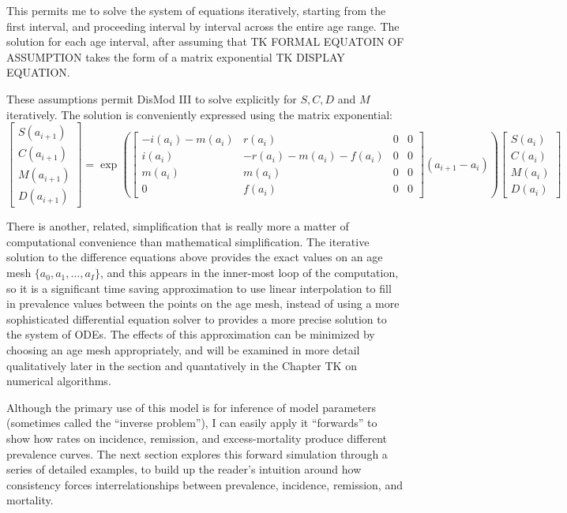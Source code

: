 This permits me to solve the system of equations iteratively, starting
from the first interval, and proceeding interval by interval across
the entire age range. The solution for each age interval, after
assuming that TK FORMAL EQUATOIN OF ASSUMPTION takes the form of a
matrix exponential TK DISPLAY EQUATION.

These assumptions permit DisMod III to solve  explicitly for $S, C, D$
and $M$ iteratively.  The solution is conveniently expressed using the
matrix exponential:
\begin{equation}
\label{eq:ode-soln}
\begin{bmatrix}
S(a_{i+1})\\C(a_{i+1})\\M(a_{i+1})\\D(a_{i+1})
\end{bmatrix}
=
\exp\left(\begin{bmatrix}
-i(a_i)-m(a_i) & r(a_i)             & 0&0 \\
i(a_i)      & -r(a_i) -m(a_i) - f(a_i) & 0&0\\
m(a_i)      & m(a_i)             & 0&0 \\
0        & f(a_i)            & 0&0
\end{bmatrix}
(a_{i+1}-a_i)\right)
\begin{bmatrix}
S(a_i)\\C(a_i)\\M(a_i)\\D(a_i)
\end{bmatrix}
\end{equation}

There is another, related, simplification that is really more a matter
of computational convenience than mathematical simplification.  The
iterative solution to the difference equations above provides the
exact values on an age mesh $\{a_0, a_1, \ldots, a_I\}$, and this
appears in the inner-most loop of the computation, so it is a
significant time saving approximation to use linear interpolation to
fill in prevalence values between the points on the age mesh, instead
of using a more sophisticated differential equation solver to provides
a more precise solution to the system of ODEs. The effects of this
approximation can be minimized by choosing an age mesh appropriately,
and will be examined in more detail qualitatively later in the section
and quantatively in the Chapter TK on numerical algorithms.

Although the primary use of this model is for inference of model
parameters (sometimes called the ``inverse problem''), I can easily
apply it ``forwards'' to show how rates on incidence, remission, and
excess-mortality produce different prevalence curves. The next section
explores this forward simulation through a series of detailed
examples, to build up the reader's intuition around how consistency
forces interrelationships between prevalence, incidence, remission,
and mortality.


